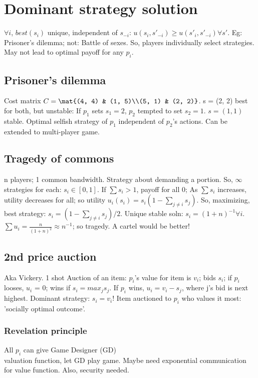 \documentclass[oneside, article]{memoir}
\begin{document}
\section{Dominant strategy solution}
$\forall i$, $best(s_{i})$ unique, independent of $s_{-i}$: $u(s_{i}, s'_{-i}) \geq u(s'_{i}, s'_{-i}) \forall s'$. Eg: Prisoner's dilemma; not: Battle of sexes. So, players individually select strategies. May not lead to optimal payoff for any $p_{i}$.

\subsection{Prisoner's dilemma}
Cost matrix $C = \mat{(4, 4) & (1, 5)\\(5, 1) & (2, 2)}$. s = (2, 2) best for both, but unstable: If $p_{1}$ sets $s_{1} = 2$, $p_{2}$ tempted to set $s_{2} = 1$. $s = (1, 1)$ stable. Optimal selfish strategy of $p_{1}$ independent of $p_{2}$'s actions. Can be extended to multi-player game.

\subsection{Tragedy of commons}
n players; 1 common bandwidth. Strategy about demanding a portion. So, $\infty$ strategies for each: $s_{i} \in [0,1]$. If $\sum s_{i} > 1$, payoff for all 0; As $\sum s_{i}$ increases, utility decreases for all; so utility $u_{i}(s_{i}) = s_{i}(1-\sum_{j\neq i}s_{j})$. So, maximizing, best strategy: $s_{i} = (1-\sum_{j\neq i}s_{j})/2$. Unique stable soln: $s_{i} = (1+n)^{-1} \forall i$. $\sum u_i = \frac{n}{(1+n)^{2}} \approx n^{-1}$; so tragedy. A cartel would be better!

\subsection{2nd price auction}
Aka Vickery. 1 shot Auction of an item: $p_{i}$'s value for item is $v_{i}$; bids $s_{i}$; if $p_{i}$ looses, $u_{i}$ = 0; wins if $s_{i} = max_{j}s_{j}$. If $p_{i}$ wins, $u_{i} = v_{i} - s_{j}$, where j's bid is next highest. Dominant strategy: $s_{i} = v_{i}$! Item auctioned to $p_{i}$ who values it most: 'socially optimal outcome'.

\subsubsection{Revelation principle}
All $p_{i}$ can give Game Designer (GD) \\
valuation function, let GD play game. Maybe need exponential communication for value function. Also, security needed.
\end{document}
